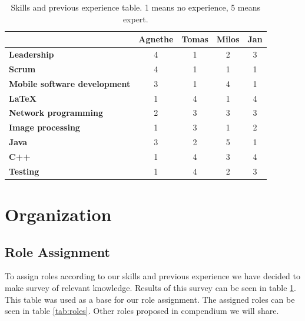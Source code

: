 \documentclass{article}
\newcommand{\ra}[1]{\renewcommand{\arraystretch}{#1}}
\begin{document}
\begin{table}\centering \ra{1.3}
    \caption{Skills and previous experience table. 1 means no experience, 5 means expert.}
    \label{tab:skills}
    \vspace{2mm}
    \begin{tabular}{lcccc}
    \toprule
                                & Agnethe   & Tomas & Milos & Jan \\
    \midrule
    \textbf{Leadership                 } & 4         & 1     & 2     & 3     \\ 
    \textbf{Scrum                      } & 4         & 1     & 1     & 1     \\ 
    \textbf{Mobile software development} & 3         & 1     & 4     & 1     \\ 
    \textbf{\LaTeX                     } & 1         & 4     & 1     & 4     \\ 
    \textbf{Network programming        } & 2         & 3     & 3     & 3     \\ 
    \textbf{Image processing           } & 1         & 3     & 1     & 2     \\ 
    \textbf{Java                       } & 3         & 2     & 5     & 1     \\ 
    \textbf{C++                        } & 1         & 4     & 3     & 4     \\ 
    \textbf{Testing                    } & 1         & 4     & 2     & 3     \\
    \bottomrule
    \end{tabular}
\end{table}

\section{Organization}

\subsection{Role Assignment}
To assign roles according to our skills and previous experience we have decided to make survey of relevant knowledge. 
Results of this survey can be seen in table \ref{tab:skills}. 
This table was used as a base for our role assignment. 
The assigned roles can be seen in table \ref{tab:roles}. Other roles proposed in compendium we will share.
\end{document}
